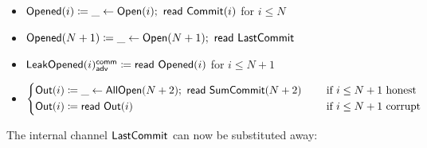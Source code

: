\begin{itemize}
\item {\color{red} $\mathsf{Opened}(i) \coloneqq \_ \leftarrow \mathsf{Open}(i); \ \mathsf{read} \ \mathsf{Commit}(i)$ for $i \leq N$}
\item {\color{red} $\mathsf{Opened}(N+1) \coloneqq \_ \leftarrow \mathsf{Open}(N+1); \ \mathsf{read} \ \mathsf{LastCommit}$}
\item {\color{red} $\mathsf{LeakOpened}(i)^{\mathsf{comm}}_{\mathsf{adv}} \coloneqq \mathsf{read} \ \mathsf{Opened}(i)$ for $i \leq N+1$}
\item $\begin{cases*} \Out(i) \coloneqq \_ \leftarrow \AllOpen(N+2); \ \read{\SumCommit(N+2)} & \hspace{10pt} \text{if $i \leq N+1$ honest} \\ \Out(i) \coloneqq \read{\Out(i)} & \hspace{10pt} \text{if $i \leq N+1$ corrupt} \end{cases*}$
\end{itemize}

\noindent The internal channel $\mathsf{LastCommit}$ can now be substituted away:

